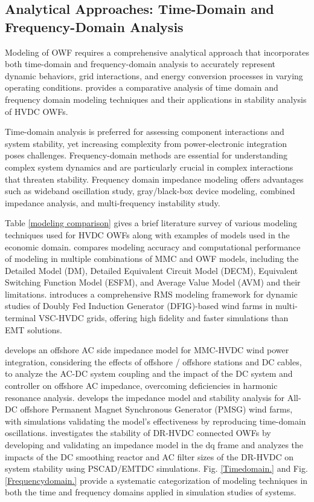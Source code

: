 \documentclass{ieeeaccess}
\begin{document}
\subsection{\textbf{Analytical Approaches: Time-Domain and Frequency-Domain Analysis}}
Modeling of OWF requires a comprehensive analytical approach that incorporates both time-domain and frequency-domain analysis to accurately represent dynamic behaviors, grid interactions, and energy conversion processes in varying operating conditions.\cite{deng2023review} provides a comparative analysis of time domain and frequency domain modeling techniques and their applications in stability analysis of HVDC OWFs.

Time-domain analysis is preferred for assessing component interactions and system stability, yet increasing complexity from power-electronic integration poses challenges. Frequency-domain methods are essential for understanding complex system dynamics and are particularly crucial in complex interactions that threaten stability. Frequency domain impedance modeling offers advantages such as wideband oscillation study, gray/black-box device modeling, combined impedance analysis, and multi-frequency instability study.

Table \ref{modeling comparison} gives a brief literature survey of various modeling techniques used for HVDC OWFs along with examples of models used in the economic domain. \cite{karaagac2016offshore} compares modeling accuracy and computational performance of modeling in multiple combinations of MMC and OWF models, including the Detailed Model (DM), Detailed Equivalent Circuit Model (DECM), Equivalent Switching Function Model (ESFM), and Average Value Model (AVM) and their limitations. \cite{castro2020dynamic} introduces a comprehensive RMS modeling framework for dynamic studies of Doubly Fed Induction Generator (DFIG)-based wind farms in multi-terminal VSC-HVDC grids, offering high fidelity and faster simulations than EMT solutions.

\cite{ji2019impedance} develops an offshore AC side impedance model for MMC-HVDC wind power integration, considering the effects of offshore / offshore stations and DC cables, to analyze the AC-DC system coupling and the impact of the DC system and controller on offshore AC impedance, overcoming deficiencies in harmonic resonance analysis. \cite{wang2022impedance} develops the impedance model and stability analysis for All-DC offshore Permanent Magnet Synchronous Generator
 (PMSG) wind farms, with simulations validating the model's effectiveness by reproducing time-domain oscillations. \cite{yu2021impedance} investigates the stability of DR-HVDC connected OWFs by developing and validating an impedance model in the dq frame and analyzes the impacts of the DC smoothing reactor and AC filter sizes of the DR-HVDC on system stability using PSCAD/EMTDC simulations. Fig. \ref{Timedomain.} and Fig. \ref{Frequencydomain.} provide a systematic categorization of modeling techniques in both the time and frequency domains applied in simulation studies of systems.
\end{document}
